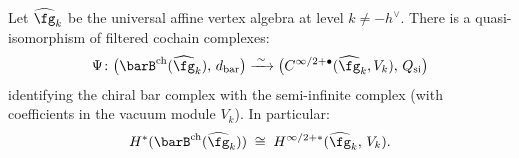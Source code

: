 \begin{theorem}[Bar complex = semi-infinite complex for KM;
\ClaimStatusConditional]
\label{thm:bar-semi-infinite-km}
Let $\widehat{\fg}_k$ be the universal affine vertex algebra at level
$k \neq -h^\vee$. There is a quasi-isomorphism of filtered cochain
complexes:
\begin{equation}\label{eq:bar-semi-infinite}
\Psi \colon
 \bigl(\barB^{\mathrm{ch}}(\widehat{\fg}_k),\, d_{\mathrm{bar}}\bigr)
 \xrightarrow{\;\sim\;}
 \bigl(C^{\infty/2+\bullet}(\widehat{\fg}_k, V_k),\, Q_{\mathrm{si}}\bigr)
\end{equation}
identifying the chiral bar complex with the semi-infinite complex
\textup{(}with coefficients in the vacuum module $V_k$\textup{)}.
In particular:
\begin{equation}\label{eq:bar-equals-semi-infinite}
H^*(\barB^{\mathrm{ch}}(\widehat{\fg}_k))
\;\cong\;
H^{\infty/2+*}(\widehat{\fg}_k,\, V_k).
\end{equation}
\end{theorem}


